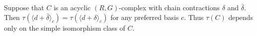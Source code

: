 Suppose that $C$ is an acyclic $(R, G)$-complex with chain contractions $\delta$ and $\bar{\delta}$. Then $\tau(\langle d + \bar{\delta} \rangle_c) = \tau(\langle d + \delta \rangle_c)$ for any preferred basis $c$. Thus $\tau(C)$ depends only on the simple isomorphism class of $C$.
